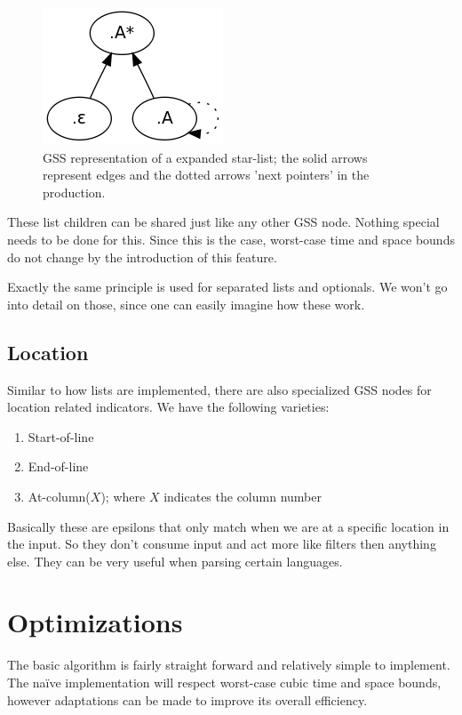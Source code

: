 \documentclass[a4paper,10pt]{article}
\begin{document}
\begin{figure}[H]
\centering
\includegraphics[scale=0.5]{star-list.png}
\caption{GSS representation of a expanded star-list; the solid arrows represent edges and the dotted arrows 'next pointers' in the production.}
\end{figure}

These list children can be shared just like any other GSS node. Nothing special needs to be done for this. Since this is the case, worst-case time and space bounds do not change by the introduction of this feature.

Exactly the same principle is used for separated lists and optionals. We won't go into detail on those, since one can easily imagine how these work.

\subsection{Location}

Similar to how lists are implemented, there are also specialized GSS nodes for location related indicators. We have the following varieties:
\begin{enumerate}
 \setlength{\itemsep}{0pt}
 \setlength{\parskip}{0pt}
 \setlength{\parsep}{0pt}
 
 \item Start-of-line
 \item End-of-line
 \item At-column($X$); where $X$ indicates the column number
\end{enumerate}
Basically these are epsilons that only match when we are at a specific location in the input. So they don't consume input and act more like filters then anything else. They can be very useful when parsing certain languages.

\section{Optimizations}

The basic algorithm is fairly straight forward and relatively simple to implement. The naïve implementation will respect worst-case cubic time and space bounds, however adaptations can be made to improve its overall efficiency.
\end{document}
